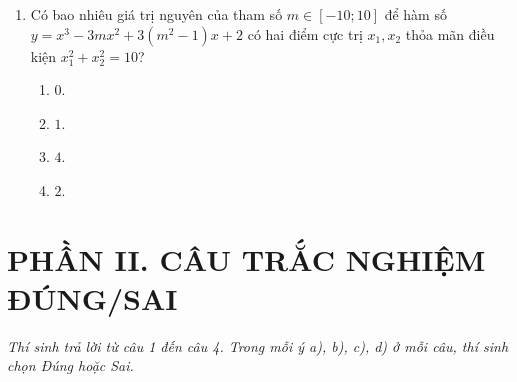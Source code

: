 \documentclass[12pt,a4paper]{article}
\begin{document}
\begin{enumerate}[label=\textbf{Câu \arabic*:}, leftmargin=*]
\item Có bao nhiêu giá trị nguyên của tham số $m \in [-10; 10]$ để hàm số $y = x^3 - 3mx^2 + 3(m^2 - 1)x + 2$ có hai điểm cực trị $x_1, x_2$ thỏa mãn điều kiện $x_1^2 + x_2^2 = 10$?
\begin{enumerate}[label=\Alph*.]
    \item $0$.
    \item $1$.
    \item $4$.
    \item $2$.
\end{enumerate}

\end{enumerate}

\section*{PHẦN II. CÂU TRẮC NGHIỆM ĐÚNG/SAI}
\textit{Thí sinh trả lời từ câu 1 đến câu 4. Trong mỗi ý a), b), c), d) ở mỗi câu, thí sinh chọn Đúng hoặc Sai.}
\end{document}
